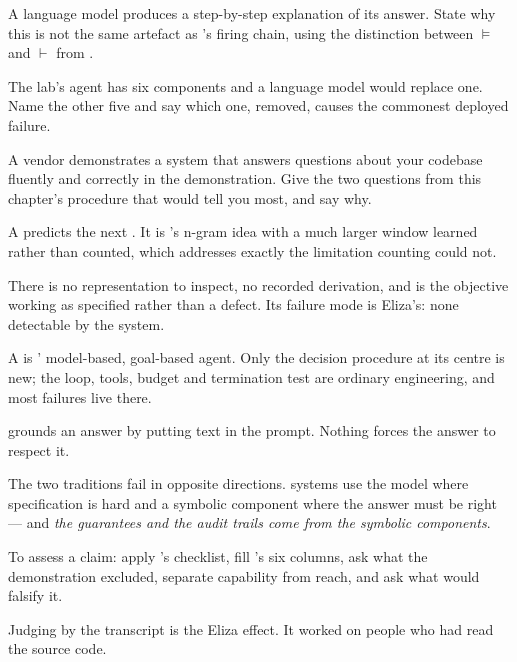 \begin{checkpoint}
\begin{tightnum}
  \item A language model produces a step-by-step explanation of its answer. State
        why this is not the same artefact as 's firing chain, using
        the distinction between $\models$ and $\vdash$ from .
  \item The lab's agent has six components and a language model would replace one.
        Name the other five and say which one, removed, causes the commonest
        deployed failure.
  \item A vendor demonstrates a system that answers questions about your codebase
        fluently and correctly in the demonstration. Give the two questions from
        this chapter's procedure that would tell you most, and say why.
\end{tightnum}
\end{checkpoint}

\begin{chaptersummary}
\begin{tight}
  \item A  predicts the next . It is
        's n-gram idea with a much larger window learned rather than
        counted, which addresses exactly the limitation counting could not.
  \item There is no representation to inspect, no recorded derivation, and
         is the objective working as specified rather than a
        defect. Its failure mode is Eliza's: none detectable by the system.
  \item A  is ' model-based, goal-based agent.
        Only the decision procedure at its centre is new; the loop, tools, budget
        and termination test are ordinary engineering, and most failures live
        there.
  \item {} grounds an answer by putting text in the prompt. Nothing
        forces the answer to respect it.
  \item The two traditions fail in opposite directions. 
        systems use the model where specification is hard and a symbolic component
        where the answer must be right --- and \emph{the guarantees and the audit
        trails come from the symbolic components}.
  \item To assess a claim: apply 's checklist, fill
        's six columns, ask what the demonstration excluded,
        separate capability from reach, and ask what would falsify it.
  \item Judging by the transcript is the Eliza effect. It worked on people who had
        read the source code.
\end{tight}
\end{chaptersummary}

